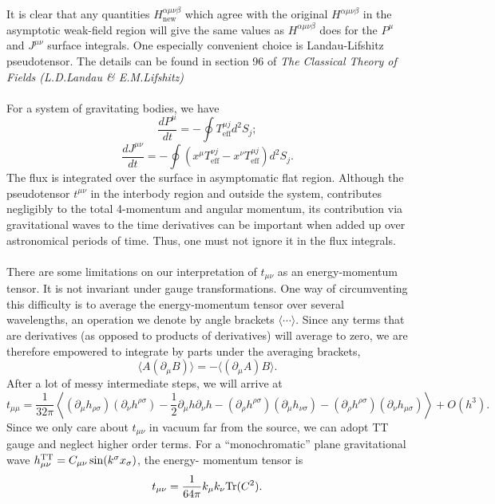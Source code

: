 \\ \\
It is clear that any quantities $H^{\alpha\mu\nu\beta}_{\mathrm{new}}$  which agree with the original $H^{\alpha\mu\nu\beta}$ in the asymptotic weak-field region will give the same values as $H^{\alpha\mu\nu\beta}$ does for the $P^{\mu}$ and $J^{\mu\nu}$ surface integrals. One especially convenient
choice is Landau-Lifshitz pseudotensor. The details can be found in section 96 of \emph{The Classical Theory of Fields (L.D.Landau \& E.M.Lifshitz)}
\\ \\
For a system of gravitating bodies, we have
\[\frac{dP^{\mu}}{dt} = -\oint T^{\mu j}_{\mathrm{eff}}d^2S_j ;\]
\[\frac{dJ^{\mu\nu}}{dt} = -\oint(x^{\mu}T^{\nu j}_{\mathrm{eff}} - x^{\nu}T^{\mu j}_{\mathrm{eff}}) d^2 S_j.\]
The flux is integrated over the surface in asymptomatic flat region. Although the pseudotensor $t^{\mu\nu}$ in the interbody region and outside the system, contributes negligibly to the total 4-momentum and angular momentum, its contribution via gravitational waves to the time derivatives can be important when added up over astronomical periods of time. Thus, one must not ignore it in the flux integrals.
\\ \\
There are some limitations on our interpretation of $t_{\mu\nu}$ as an energy-momentum tensor. 
It is not invariant  under gauge transformations. 
One way of circumventing this difficulty is to average the energy-momentum tensor over several wavelengths, an operation we denote by angle brackets $\langle \cdots \rangle$.
Since any terms that are derivatives (as opposed to products of derivatives) will average to zero, we are therefore empowered to integrate by parts under the averaging brackets,
\[\langle A(\partial_{\mu} B) \rangle = - \langle (\partial_{\mu} A)B \rangle.\]
After a lot of messy intermediate steps, we will arrive at
\[t_{\mu\mu} = \frac{1}{32\pi} \left\langle (\partial_{\mu}h_{\rho\sigma})(\partial_{\nu}h^{\rho\sigma}) - \frac{1}{2} \partial_{\mu} h \partial_{\nu} h - (\partial_{\rho}h^{\rho\sigma})(\partial_{\mu}h_{\nu\sigma}) - (\partial_{\rho}h^{\rho\sigma})(\partial_{\nu}h_{\mu\sigma})\right\rangle + O(h^3).\]
Since we only care about $t_{\mu\nu}$ in vacuum far from the source, we can adopt TT gauge and neglect higher order terms. 
For a ``monochromatic'' plane gravitational wave $h^{\rm TT}_{\mu\nu} = C_{\mu\nu} \sin(k^{\sigma}x_{\sigma})$, the energy- momentum tensor is
\[t_{\mu\nu} = \frac{1}{64\pi} k_{\mu}k_{\nu} {\rm Tr}(C^2).\]
